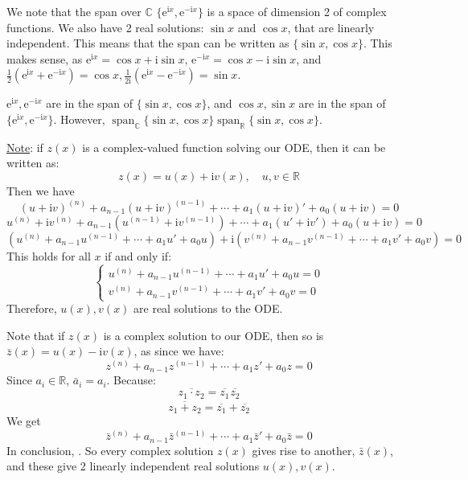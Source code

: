 \documentclass{article}
\newcommand{\mathe}{\mathrm{e}}
\newcommand{\mathi}{\mathrm{i}}
\newcommand{\nosymbol}{}
\newcommand{\tmop}[1]{\ensuremath{\operatorname{#1}}}
\newcommand{\tmtextbf}[1]{\text{{\bfseries{#1}}}}
\newcommand{\nonconverted}[1]{\mbox{}}
\begin{document}
We note that the span over $\mathbb{C}$ $\{ \mathe^{\mathi x}, \mathe^{-
\mathi x} \}$ is a space of dimension 2 of complex functions. We also have 2
real solutions: $\sin x$ and $\cos x$, that are linearly independent. This
means that the span can be written as $\{ \sin x, \cos x \}$. This makes
sense, as {$\mathe^{\mathi x} = \cos x + \mathi \sin x$, $\mathe^{- \mathi x}
= \cos x - \mathi \sin x$}, and $\frac{1}{2} (\mathe^{\mathi x} + \mathe^{-
\mathi x}) = \cos x, \frac{1}{2 \mathi} (\mathe^{\mathi x} - \mathe^{- \mathi
x}) = \sin x$.

$\mathe^{\mathi x}, \mathe^{- \mathi x}$ are in the span of $\{ \sin x, \cos x
\}$, and $\cos x, \sin x$ are in the span of $\{ \mathe^{\mathi x}, \mathe^{-
\mathi x} \}$. However, $\tmop{span}_{\mathbb{C}}  \{ \sin x, \cos x \}
\nonconverted{nsupset} \tmop{span}_{\mathbb{R}}  \{ \sin x, \cos x \}$.

{\underline{Note}}: if $z (x)$ is a complex-valued function solving our ODE,
then it can be written as:
\[ z (x) = u (x) + \mathi v (x), \quad u, v \in \mathbb{R} \]
Then we have
\[ (u + \mathi v)^{(n)} + a_{n - 1} (u + \mathi v)^{(n - 1)} + \cdots + a_1 (u
   + \mathi v)' + a_0 (u + \mathi v) = 0 \]
\[ u^{(n)} + \mathi v^{(n)} + a_{n - 1} (u^{(n - 1)} + \mathi v^{(n - 1)}) +
   \cdots + a_1 (u' + \mathi v') + a_0 (u + \mathi v) = 0 \]
\[ (u^{(n)} + a_{n - 1} u^{(n - 1)} + \cdots + a_1 u' + a_0 u) + \mathi
   (v^{(n)} + a_{n - 1} v^{(n - 1)} + \cdots + a_1 v' + a_0 v) = 0 \]
This holds for all $x$ if and only if:
\[ \left\{\begin{array}{l}
     u^{(n)} + a_{n - 1} u^{(n - 1)} + \cdots + a_1 u' + a_0 u = 0\\
     v^{(n)} + a_{n - 1} v^{(n - 1)} + \cdots + a_1 v' + a_0 v = 0
   \end{array}\right. \]
Therefore, $u (x), v (x)$ are \tmtextbf{both} real solutions to the ODE.

Note that if $z (x)$ is a complex solution to our ODE, then so is $\bar{z} (x)
= u (x) - \mathi v (x)$, as since we have:
\[ z^{(n)} + a_{n - 1} z^{(n - 1)} + \cdots + a_1 z' + a_0 z = 0 \]
Since $a_i \in \mathbb{R}$, $\bar{a}_i = a_i$. Because:
\[ \overline{z_1 \cdot z_2} = \overline{z_1}_{\nosymbol}  \overline{z_2} \]
\[ \overline{z_1 + z_2} = \overline{z_1} + \overline{z_2} \]
We get
\[ \bar{z}^{(n)} + a_{n - 1}  \bar{z}^{(n - 1)} + \cdots + a_1  \bar{z}' + a_0
   \bar{z} = 0 \]
In conclusion, \tmtextbf{complex roots come in pairs}. So every complex
solution $z (x)$ gives rise to another, $\bar{z} (x)$, and these give 2
linearly independent real solutions $u (x), v (x)$.
\end{document}

